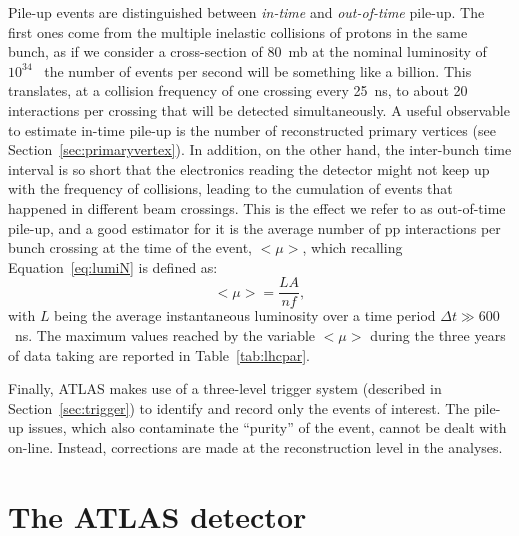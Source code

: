 Pile-up events are distinguished between \textit{in-time} and \textit{out-of-time} pile-up. The first ones come 
from the multiple inelastic collisions of protons in the same bunch, as if we consider a cross-section of 80~mb
at the nominal luminosity of $10^{34}$~ the number of events per second will be something like
a billion. This translates, at a collision frequency of one crossing every 25~ns, to about 20 interactions per
crossing that will be detected simultaneously. A useful observable to estimate in-time pile-up is
the number of reconstructed primary vertices (see Section~\ref{sec:primaryvertex}). %
In addition, on the other hand, the inter-bunch time interval is so short
that the electronics reading the detector might not keep up with the frequency of collisions, leading to the
cumulation of events that happened in different beam crossings. This is the effect we refer to as 
out-of-time pile-up, and a good estimator for it is the average number of pp interactions
per bunch crossing at the time of the event, $<\mu>$, which recalling Equation~\ref{eq:lumiN} is defined as:
\begin{equation}\label{eq:mu}
<\mu> = \dfrac{LA}{nf},
\end{equation}
with $L$ being the average instantaneous luminosity over a time period $\Delta t\gg 600$~ns.
The maximum values reached by the variable $<\mu>$ during the three years of data taking
are reported in Table~\ref{tab:lhcpar}.

Finally, ATLAS makes use of a three-level trigger system 
(described in Section~\ref{sec:trigger}) to identify
and record only the events of interest. The pile-up issues,
which also contaminate the ``purity'' of the event,
cannot be dealt with on-line. Instead, corrections are made
at the reconstruction level in the analyses.



\section{The ATLAS detector}\label{sec:atlas}

